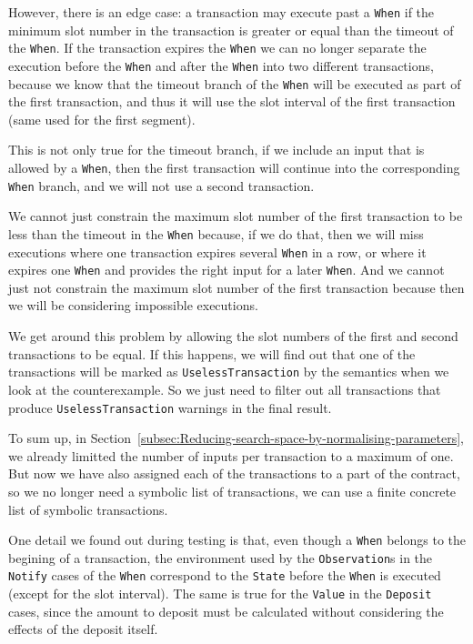 \documentclass[english,runningheads]{llncs}
\begin{document}
However, there is an edge case: a transaction may execute past 
a \texttt{When} if the minimum slot number in the transaction is greater
or equal than the timeout of the \texttt{When}. If the transaction expires
the \texttt{When} we can no longer separate the execution before the
\texttt{When} and after the \texttt{When} into two different transactions,
because we know that the timeout branch of the \texttt{When} will be executed
as part of the first transaction, and thus it will use the slot interval
of the first transaction (same used for the first segment).

This is not only true for the timeout branch, if we include
an input that is allowed by a \texttt{When}, then the first transaction
will continue into the corresponding \texttt{When}
branch, and we will not use a second transaction.

We cannot just constrain the maximum slot number of the first transaction
to be less than the timeout in the \texttt{When} because, if we do
that, then we will miss executions where one transaction expires several
\texttt{When} in a row, or where it expires one \texttt{When} and provides
the right input for a later \texttt{When}. And we cannot just not constrain
the maximum slot number of the first transaction because then we will
be considering impossible executions.

We get around this problem by allowing the slot numbers of the first
and second transactions to be equal. If this happens, we will find
out that one of the transactions will be marked as \texttt{UselessTransaction}
by the semantics when we look at the counterexample. So we just need
to filter out all transactions that produce \texttt{UselessTransaction}
warnings in the final result.

To sum up, in Section~\ref{subsec:Reducing-search-space-by-normalising-parameters}, we already limitted the number of inputs per transaction
to a maximum of one. But now we have also assigned each of the
transactions to a part of the contract, so we no longer need a symbolic
list of transactions, we can use a finite concrete list of symbolic
transactions.

One detail we found out during testing is that, even though a \texttt{When}
belongs to the begining of a transaction, the environment used by
the \texttt{Observation}s in the \texttt{Notify} cases of the \texttt{When}
correspond to the \texttt{State} before the \texttt{When} is executed (except
for the slot interval). The same is true for the \texttt{Value} in the
\texttt{Deposit} cases, since the amount to deposit must be calculated without
considering the effects of the deposit itself.
\end{document}
